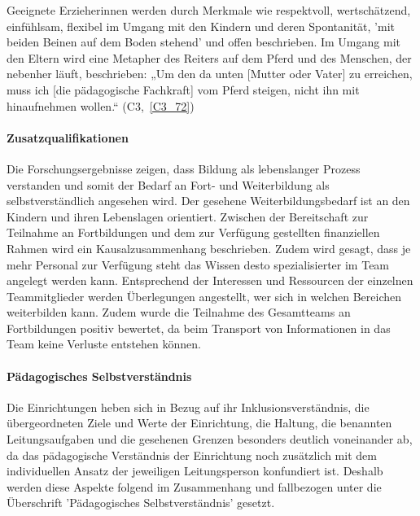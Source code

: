 Geeignete Erzieherinnen werden durch Merkmale wie respektvoll, wert\-schätzend, einfühlsam, flexibel im Umgang mit den Kindern und deren Spontanität, 'mit beiden Beinen auf dem Boden stehend' und offen beschrieben.
Im Umgang mit den Eltern wird eine Metapher des Reiters auf dem Pferd und des Menschen, der nebenher läuft, beschrieben:  
„Um den da unten [Mutter oder Vater] zu erreichen, muss ich [die pädagogische Fachkraft] vom Pferd steigen, nicht ihn mit hinaufnehmen wollen.“ (C3,~\ref{C3_72}) 

\paragraph{Zusatzqualifikationen}

Die Forschungsergebnisse zeigen, dass Bildung als lebenslanger Prozess verstanden und somit der Bedarf an Fort- und Weiterbildung als selbstverständlich angesehen wird. Der gesehene Weiterbildungsbedarf ist an den Kindern und ihren Lebenslagen orientiert.
Zwischen der Bereitschaft zur Teilnahme an Fortbildungen und dem zur Verfügung gestellten finanziellen Rahmen wird ein Kausalzusammenhang beschrieben. Zudem wird gesagt, dass je mehr Personal zur Verfügung steht das Wissen desto spezialisierter im Team angelegt werden kann. Entsprechend der Interessen und Ressourcen der einzelnen Teammitglieder werden Überlegungen angestellt, wer sich in welchen Bereichen weiterbilden kann. Zudem wurde die Teilnahme des Gesamtteams an Fortbildungen positiv bewertet, da beim Transport von Informationen in das Team keine Verluste entstehen können. 

\paragraph{Pädagogisches Selbstverständnis} 
Die Einrichtungen heben sich in Bezug auf ihr Inklusions\-verständnis, die übergeordneten Ziele und Werte der Einrichtung, die Haltung, die benannten Leitungsaufgaben und die gesehenen Grenzen besonders deutlich voneinander ab, da das pädagogische Verständnis der Einrichtung noch zusätzlich mit dem individuellen Ansatz der jeweiligen Leitungsperson konfundiert ist. Deshalb werden diese Aspekte folgend im Zusammenhang und fallbezogen unter die Überschrift 'Pädagogisches Selbstverständnis' gesetzt.

